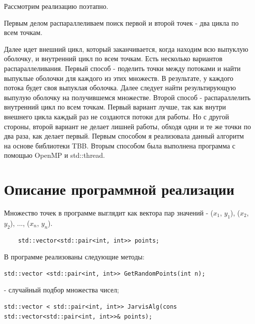 \documentclass{report}
\begin{document}
\par Рассмотрим реализацию поэтапно.
\par Первым делом распараллеливаем поиск первой и второй точек - два цикла по всем точкам.
\par Далее идет внешний цикл, который заканчивается, когда находим всю выпуклую оболочку, и внутренний цикл по всем точкам. Есть несколько вариантов распараллеливания. Первый способ - поделить точки между потоками и найти выпуклые оболочки для каждого из этих множеств. В результате, у каждого потока будет своя выпуклая оболочка. Далее следует найти результирующую выпулую оболочку на получившемся множестве. Второй способ - распараллелить внутренний цикл по всем точкам. Первый вариант лучше, так как внутри внешнего цикла каждый раз не создаются потоки для работы. Но с другой стороны, второй вариант не делает лишней работы, обходя одни и те же точки по два раза, как делает первый. Первым способом я реализовала данный алгоритм на основе библиотеки TBB. Вторым способом была выполнена программа с помощью OpenMP и std::thread.

\newpage

\section{Описание программной реализации}
Множество точек в программе выглядит как вектора пар значений - {($x_{1}$, $y_{1}$), ($x_{2}$, $y_{2}$), ..., ($x_{n}$, $y_{n}$)}.

\vspace{10pt}
\begin{lstlisting}
	std::vector<std::pair<int, int>> points;
\end{lstlisting}
\vspace{-25pt}

\par В программе реализованы следующие методы:

\vspace{10pt}
\begin{lstlisting}
std::vector <std::pair<int, int>> GetRandomPoints(int n);
\end{lstlisting}
\vspace{-25pt}

- случайный подбор множества чисел;

\vspace{10pt}
\begin{lstlisting}
std::vector < std::pair<int, int>> JarvisAlg(cons std::vector<std::pair<int, int>>& points);
\end{lstlisting}
\vspace{-25pt}
\end{document}
